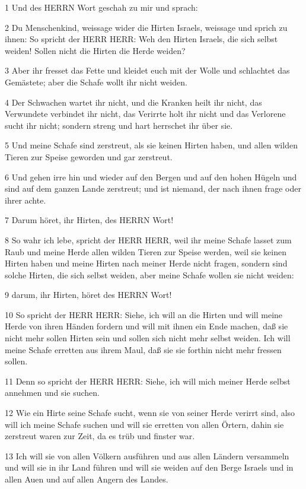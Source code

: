 \par 1 Und des HERRN Wort geschah zu mir und sprach:
\par 2 Du Menschenkind, weissage wider die Hirten Israels, weissage und sprich zu ihnen: So spricht der HERR HERR: Weh den Hirten Israels, die sich selbst weiden! Sollen nicht die Hirten die Herde weiden?
\par 3 Aber ihr fresset das Fette und kleidet euch mit der Wolle und schlachtet das Gemästete; aber die Schafe wollt ihr nicht weiden.
\par 4 Der Schwachen wartet ihr nicht, und die Kranken heilt ihr nicht, das Verwundete verbindet ihr nicht, das Verirrte holt ihr nicht und das Verlorene sucht ihr nicht; sondern streng und hart herrschet ihr über sie.
\par 5 Und meine Schafe sind zerstreut, als sie keinen Hirten haben, und allen wilden Tieren zur Speise geworden und gar zerstreut.
\par 6 Und gehen irre hin und wieder auf den Bergen und auf den hohen Hügeln und sind auf dem ganzen Lande zerstreut; und ist niemand, der nach ihnen frage oder ihrer achte.
\par 7 Darum höret, ihr Hirten, des HERRN Wort!
\par 8 So wahr ich lebe, spricht der HERR HERR, weil ihr meine Schafe lasset zum Raub und meine Herde allen wilden Tieren zur Speise werden, weil sie keinen Hirten haben und meine Hirten nach meiner Herde nicht fragen, sondern sind solche Hirten, die sich selbst weiden, aber meine Schafe wollen sie nicht weiden:
\par 9 darum, ihr Hirten, höret des HERRN Wort!
\par 10 So spricht der HERR HERR: Siehe, ich will an die Hirten und will meine Herde von ihren Händen fordern und will mit ihnen ein Ende machen, daß sie nicht mehr sollen Hirten sein und sollen sich nicht mehr selbst weiden. Ich will meine Schafe erretten aus ihrem Maul, daß sie sie forthin nicht mehr fressen sollen.
\par 11 Denn so spricht der HERR HERR: Siehe, ich will mich meiner Herde selbst annehmen und sie suchen.
\par 12 Wie ein Hirte seine Schafe sucht, wenn sie von seiner Herde verirrt sind, also will ich meine Schafe suchen und will sie erretten von allen Örtern, dahin sie zerstreut waren zur Zeit, da es trüb und finster war.
\par 13 Ich will sie von allen Völkern ausführen und aus allen Ländern versammeln und will sie in ihr Land führen und will sie weiden auf den Berge Israels und in allen Auen und auf allen Angern des Landes.
